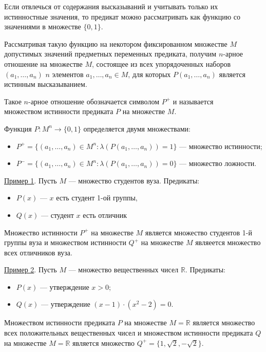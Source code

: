 Если отвлечься от содержания высказываний и учитывать только их истинностные значения, то предикат можно рассматривать как функцию со значениями в множестве $\{0, 1\}$.

Рассматривая такую функцию на некотором фиксированном множестве $M$ допустимых значений предметных переменных предиката, получим $n$-арное отношение на множестве $M$, состоящее из всех упорядоченных наборов $(a_1,\dots,a_n)$ $n$ элементов $a_1,\dots,a_n \in M$, для которых $P(a_1, \dots, a_n)$ является истинным высказыванием.

Такое $n$-арное отношение обозначается символом $P^+$ и называется $\textit{множеством истинности}$ предиката $P$ на множестве $M$.

Функция $P: M^n \to \{0, 1\}$ определяется двумя множествами:
\begin{itemize}
    \item $P^+ = \{(a_1, \dots, a_n) \in M^n: \lambda(P(a_1, \dots, a_n)) = 1\}$ --- множество истинности;
    \item $P^- = \{(a_1, \dots, a_n) \in M^n: \lambda(P(a_1, \dots, a_n)) = 0\}$ --- множество ложности.
\end{itemize}

\underline{Пример 1}. Пусть $M$ --- множество студентов вуза. Предикаты:
\begin{itemize}
    \item $P(x)$ --- $x$ есть студент 1-ой группы,
    \item $Q(x)$ --- студент $x$ есть отличник 
\end{itemize}

Множество истинности $P^+$ на множестве $M$ является множество студентов 1-й группы вуза и множеством истинности $Q^+$ на множестве $M$ являеется множество всех отличников вуза.

\underline{Пример 2}. Пусть $M$ --- множество вещественных чисел $\mathbb{R}$. Предикаты:
\begin{itemize}
    \item $P(x)$ --- утверждение $x > 0$;
    \item $Q(x)$ --- утверждение $(x-1)\cdot(x^2-2)=0$.
\end{itemize}
Множеством истинности предиката $P$ на множестве $M = \mathbb{R}$ является множество всех положительных вещественных чисел и множеством истинности предиката $Q$ на множестве $M = \mathbb{R}$ является множество $Q^+=\{1, \sqrt 2, - \sqrt 2\}$.